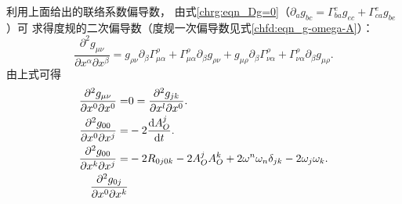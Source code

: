 利用上面给出的联络系数偏导数，
由式\eqref{chrg:eqn_Dg=0}（$\partial_a g_{bc} = \Gamma_{ba}^e g_{ec} + \Gamma_{ca}^e g_{be}$）可
求得度规的二次偏导数（度规一次偏导数见式\eqref{chfd:eqn_g-omega-A}）：
\begin{equation}
    \frac{\partial^2 g_{\mu\nu}}{\partial x^\alpha \partial x^\beta}
    =g_{\rho\nu}  \partial_\beta \Gamma_{\mu \alpha}^\rho
    + \Gamma_{\mu \alpha}^\rho \partial_\beta g_{\rho\nu}
    +g_{\mu \rho} \partial_\beta \Gamma_{\nu \alpha}^\rho
    + \Gamma_{\nu \alpha}^\rho \partial_\beta g_{\mu \rho} .
\end{equation}
由上式可得
\begin{subequations}\label{chfd:eqn_g2nd}
\begin{align}
    \frac{\partial^2 g_{\mu\nu}}{\partial x^0 \partial x^0}
    =& 0 =
    \frac{\partial^2 g_{jk}}{\partial x^l \partial x^0}   . \\
    \frac{\partial^2 g_{00}}{\partial x^0 \partial x^j}
    =& -2 \frac{{\rm d}A_{O}^j}{{\rm d}t} . \\
    \frac{\partial^2 g_{00}}{\partial x^k \partial x^j}
     =& -2 R_{0 j 0 k} - 2A_{O}^j A_{O}^k
     + 2 \omega^n \omega_n \delta_{jk} - 2 \omega_j \omega_k . \\
    \frac{\partial^2 g_{0j}}{\partial x^0 \partial x^k}

\end{align}
\end{subequations}
